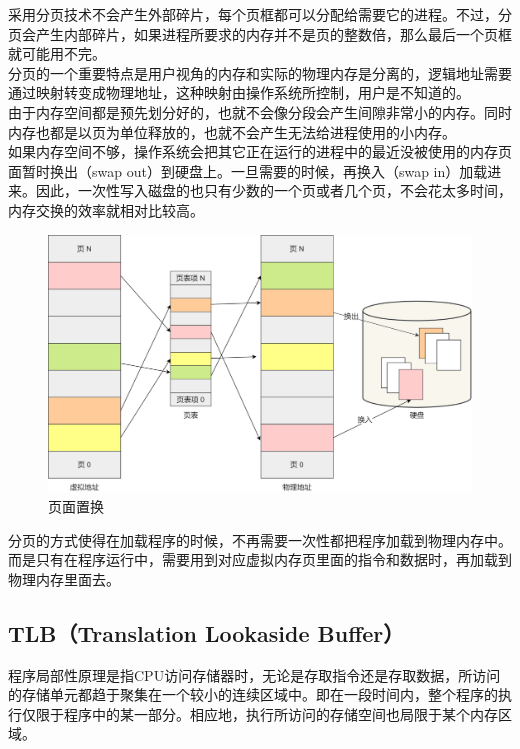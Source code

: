 采用分页技术不会产生外部碎片，每个页框都可以分配给需要它的进程。不过，分页会产生内部碎片，如果进程所要求的内存并不是页的整数倍，那么最后一个页框就可能用不完。 \\

分页的一个重要特点是用户视角的内存和实际的物理内存是分离的，逻辑地址需要通过映射转变成物理地址，这种映射由操作系统所控制，用户是不知道的。 \\

由于内存空间都是预先划分好的，也就不会像分段会产生间隙非常小的内存。同时内存也都是以页为单位释放的，也就不会产生无法给进程使用的小内存。 \\

如果内存空间不够，操作系统会把其它正在运行的进程中的最近没被使用的内存页面暂时换出（swap out）到硬盘上。一旦需要的时候，再换入（swap in）加载进来。因此，一次性写入磁盘的也只有少数的一个页或者几个页，不会花太多时间，内存交换的效率就相对比较高。

\begin{figure}[H]
	\centering
	\includegraphics[]{img/C3/3-5/3.png}
	\caption{页面置换}
\end{figure}

分页的方式使得在加载程序的时候，不再需要一次性都把程序加载到物理内存中。而是只有在程序运行中，需要用到对应虚拟内存页里面的指令和数据时，再加载到物理内存里面去。

\subsection{TLB（Translation Lookaside Buffer）}

程序局部性原理是指CPU访问存储器时，无论是存取指令还是存取数据，所访问的存储单元都趋于聚集在一个较小的连续区域中。即在一段时间内，整个程序的执行仅限于程序中的某一部分。相应地，执行所访问的存储空间也局限于某个内存区域。 \\

